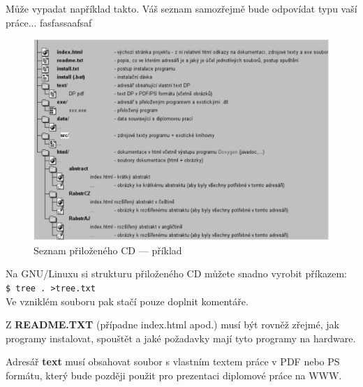 \documentclass[11pt,twoside,a4paper]{book}
\begin{document}
Může vypadat například takto. Váš seznam samozřejmě bude odpovídat typu vaší práce... \cite{TurecekThesis2011} fasfassaafsaf

\begin{figure}[h]
\begin{center}
\includegraphics[width=14cm]{figures/seznamcd}
\caption{Seznam přiloženého CD --- příklad}
\label{fig:seznamcd}
\end{center}
\end{figure}

Na GNU/Linuxu si strukturu přiloženého CD můžete snadno vyrobit příkazem:\\ 
\verb|$ tree . >tree.txt|\\
Ve vzniklém souboru pak stačí pouze doplnit komentáře.

Z \textbf{README.TXT} (případne index.html apod.)  musí být rovněž zřejmé, jak programy instalovat, spouštět a jaké požadavky mají tyto programy na hardware.

Adresář \textbf{text}  musí obsahovat soubor s vlastním textem práce v PDF nebo PS formátu, který bude později použit pro prezentaci diplomové práce na WWW.
\end{document}
